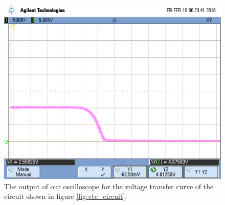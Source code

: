 \FloatBarrier
\begin{figure}[h!]
	\centering
	\includegraphics[scale=0.40]{./images/scope_0}
	\caption{The output of our oscilloscope for the voltage transfer curve of the circuit shown in figure \ref{fig:vtc_circuit}.}
	\label{fig:vtc_result}
\end{figure}
\FloatBarrier

